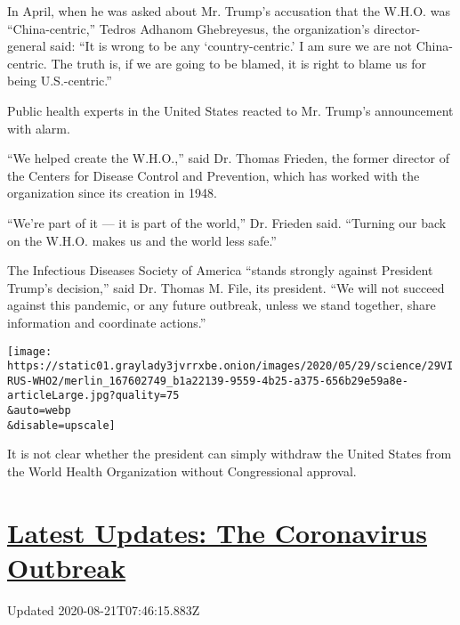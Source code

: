 In April, when he was asked about Mr. Trump's accusation that the W.H.O.
was ``China-centric,'' Tedros Adhanom Ghebreyesus, the organization's
director-general said: ``It is wrong to be any `country-centric.' I am
sure we are not China-centric. The truth is, if we are going to be
blamed, it is right to blame us for being U.S.-centric.''

Public health experts in the United States reacted to Mr. Trump's
announcement with alarm.

``We helped create the W.H.O.,'' said Dr. Thomas Frieden, the former
director of the Centers for Disease Control and Prevention, which has
worked with the organization since its creation in 1948.

``We're part of it --- it is part of the world,'' Dr. Frieden said.
``Turning our back on the W.H.O. makes us and the world less safe.''

The Infectious Diseases Society of America ``stands strongly against
President Trump's decision,'' said Dr. Thomas M. File, its president.
``We will not succeed against this pandemic, or any future outbreak,
unless we stand together, share information and coordinate actions.''

\texttt{[image: https://static01.graylady3jvrrxbe.onion/images/2020/05/29/science/29VIRUS-WHO2/merlin\_167602749\_b1a22139-9559-4b25-a375-656b29e59a8e-articleLarge.jpg?quality=75\\\&auto=webp\\\&disable=upscale]}

It is not clear whether the president can simply withdraw the United
States from the World Health Organization without Congressional
approval.

\hypertarget{latest-updates-the-coronavirus-outbreak}{%
\section{\texorpdfstring{\href{https://www.nytimes3xbfgragh.onion/2020/08/20/world/coronavirus-covid.html?action=click\&pgtype=Article\&state=default\&region=MAIN_CONTENT_1\&context=storylines_live_updates}{Latest
Updates: The Coronavirus
Outbreak}}{Latest Updates: The Coronavirus Outbreak}}\label{latest-updates-the-coronavirus-outbreak}}

Updated 2020-08-21T07:46:15.883Z

